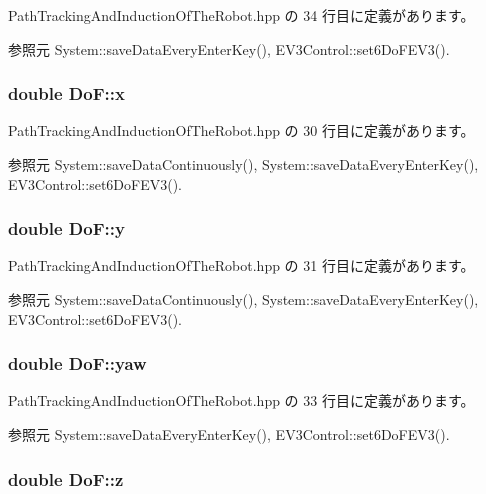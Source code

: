  Path\-Tracking\-And\-Induction\-Of\-The\-Robot.\-hpp の 34 行目に定義があります。



参照元 System\-::save\-Data\-Every\-Enter\-Key(), E\-V3\-Control\-::set6\-Do\-F\-E\-V3().

\subsubsection[{x}]{\setlength{\rightskip}{0pt plus 5cm}double Do\-F\-::x}\label{struct_do_f_ade12f9d2e1670795f645919e6ff013ef}


 Path\-Tracking\-And\-Induction\-Of\-The\-Robot.\-hpp の 30 行目に定義があります。



参照元 System\-::save\-Data\-Continuously(), System\-::save\-Data\-Every\-Enter\-Key(), E\-V3\-Control\-::set6\-Do\-F\-E\-V3().

\subsubsection[{y}]{\setlength{\rightskip}{0pt plus 5cm}double Do\-F\-::y}\label{struct_do_f_abfbe7d3335c98676e382a99d206b7509}


 Path\-Tracking\-And\-Induction\-Of\-The\-Robot.\-hpp の 31 行目に定義があります。



参照元 System\-::save\-Data\-Continuously(), System\-::save\-Data\-Every\-Enter\-Key(), E\-V3\-Control\-::set6\-Do\-F\-E\-V3().

\subsubsection[{yaw}]{\setlength{\rightskip}{0pt plus 5cm}double Do\-F\-::yaw}\label{struct_do_f_ad50a401c21ed40b7419edd1c1b6d194c}


 Path\-Tracking\-And\-Induction\-Of\-The\-Robot.\-hpp の 33 行目に定義があります。



参照元 System\-::save\-Data\-Every\-Enter\-Key(), E\-V3\-Control\-::set6\-Do\-F\-E\-V3().

\subsubsection[{z}]{\setlength{\rightskip}{0pt plus 5cm}double Do\-F\-::z}\label{struct_do_f_a85425df1c7f31461d90068c6f65f014d}



